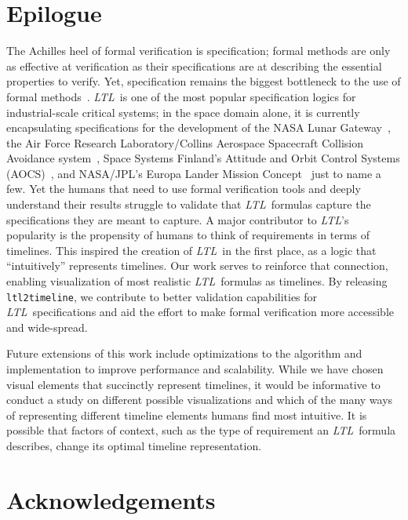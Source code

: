 \documentclass[conference]{IEEEtran}
\theoremstyle{definition}
\theoremstyle{remark}
\newcommand{\ltl}{\textit{LTL}}
\newcommand{\tool}{\texttt{ltl2timeline}}
\begin{document}
\section{Epilogue}
The Achilles heel of formal verification is specification; formal methods are only as effective at verification as their specifications are at describing the essential properties to verify. Yet, specification remains the biggest bottleneck to the use of formal methods~\cite{Roz16}. \ltl\ is one of the most popular specification logics for industrial-scale critical systems; in the space domain alone, it is currently encapsulating specifications for the development of the NASA Lunar Gateway~\cite{DBR21,DBR23}, the Air Force Research Laboratory/Collins Aerospace Spacecraft Collision Avoidance system~\cite{HDWF21}, Space Systems Finland's Attitude and Orbit Control Systems (AOCS)~\cite{ILLTV13}, and NASA/JPL's Europa Lander Mission Concept~\cite{CDRWRWL22} just to name a few.
Yet the humans that need to use formal verification tools and deeply understand their results struggle to validate that \ltl\ formulas capture the specifications they are meant to capture. A major contributor to \ltl's popularity is the propensity of humans to think of requirements in terms of timelines. This inspired the creation of \ltl\ in the first place, as a logic that ``intuitively'' represents timelines. Our work serves to reinforce that connection, enabling visualization of most realistic \ltl\ formulas as timelines. By releasing \tool, we contribute to better validation capabilities for \ltl\ specifications and aid the effort to make formal verification more accessible and wide-spread.

Future extensions of this work include optimizations to the algorithm and implementation to improve performance and scalability. While we have chosen visual elements that succinctly represent timelines, it would be informative to conduct a study on different possible visualizations and which of the many ways of representing different timeline elements humans find most intuitive. It is possible that factors of context, such as the type of requirement an \ltl\ formula describes, change its optimal timeline representation.

\section*{Acknowledgements}
\end{document}
